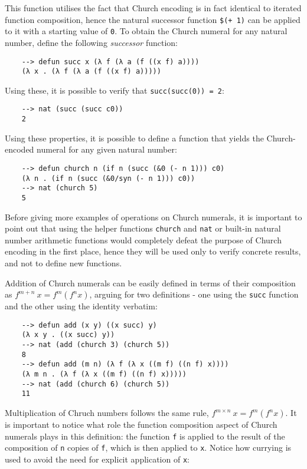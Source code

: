 This function utilises the fact that Church encoding is in fact identical to iterated function composition, hence the natural successor function \verb|$(+ 1)| can be applied to it with a starting value of \verb|0|. To obtain the Church numeral for any natural number, define the following \textit{successor} function:

\begin{Verbatim}
    --> defun succ x (λ f (λ a (f ((x f) a))))
    (λ x . (λ f (λ a (f ((x f) a)))))
\end{Verbatim}

Using these, it is possible to verify that \verb|succ(succ(0)) = 2|:

\begin{Verbatim}
    --> nat (succ (succ c0))
    2
\end{Verbatim}

Using these properties, it is possible to define a function that yields the Church-encoded numeral for any given natural number:

\begin{Verbatim}
    --> defun church n (if n (succ (&0 (- n 1))) c0)
    (λ n . (if n (succ (&0/syn (- n 1))) c0))
    --> nat (church 5)
    5
\end{Verbatim}

Before giving more examples of operations on Church numerals, it is important to point out that using the helper functions \verb|church| and \verb|nat| or built-in natural number arithmetic functions would completely defeat the purpose of Church encoding in the first place, hence they will be used only to verify concrete results, and not to define new functions.

Addition of Church numerals can be easily defined in terms of their composition as $f^{m+n}\ x = f^m (f^n x) $, arguing for two definitions - one using the \verb|succ| function and the other using the identity verbatim:

\begin{Verbatim}
    --> defun add (x y) ((x succ) y)
    (λ x y . ((x succ) y))
    --> nat (add (church 3) (church 5))
    8
    --> defun add (m n) (λ f (λ x ((m f) ((n f) x))))
    (λ m n . (λ f (λ x ((m f) ((n f) x)))))
    --> nat (add (church 6) (church 5))
    11
\end{Verbatim}

Multiplication of Chruch numbers follows the same rule, $f^{m\times n}\ x = f^m (f^n x)$. It is important to notice what role the function composition aspect of Church numerals plays in this definition: the function \verb|f| is applied to the result of the composition of \verb|n| copies of \verb|f|, which is then applied to \verb|x|. Notice how currying is used to avoid the need for explicit application of \verb|x|:

